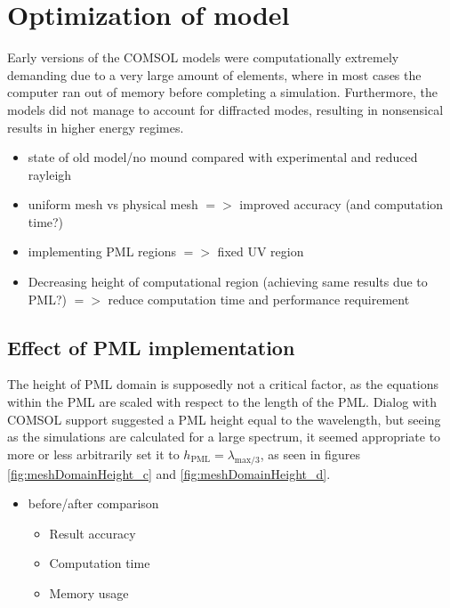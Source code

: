 \section{Optimization of model}
Early versions of the COMSOL models were computationally extremely demanding due to a very large amount of elements, where in most cases the computer ran out of memory before completing a simulation. Furthermore, the models did not manage to account for diffracted modes, resulting in nonsensical results in higher energy regimes. 

\label{sec:Optimization_of_model}
\begin{itemize}
    \item state of old model/no mound compared with experimental and reduced rayleigh
    \item uniform mesh vs physical mesh $=>$ improved accuracy (and computation time?)
    \item implementing PML regions $=>$ fixed UV region
    \item Decreasing height of computational region (achieving same results due to PML?) $=>$ reduce computation time and performance requirement
\end{itemize}

\subsection{Effect of PML implementation}
The height of PML domain is supposedly not a critical factor, as the equations within the PML are scaled with respect to the length of the PML. Dialog with COMSOL support suggested a PML height equal to the wavelength, but seeing as the simulations are calculated for a large spectrum, it seemed appropriate to more or less arbitrarily set it to $h_{\text{PML}}=\lambda_{\text{max}/3}$, as seen in figures \ref{fig:meshDomainHeight_c} and \ref{fig:meshDomainHeight_d}. 

\begin{itemize}
    \item before/after comparison 
    \begin{itemize}
        \item Result accuracy
        \item Computation time
        \item Memory usage
    \end{itemize}
\end{itemize}

